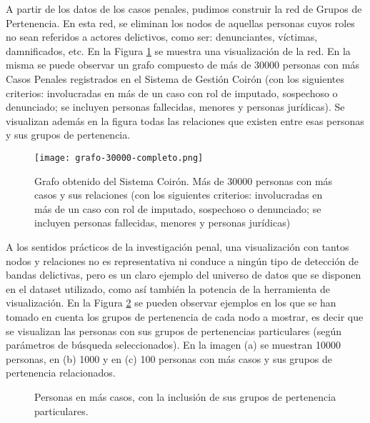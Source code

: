 A partir de los datos de los casos penales, pudimos construir la red de Grupos de Pertenencia. En esta red, se eliminan los nodos de aquellas personas cuyos roles no sean referidos a actores delictivos, como ser: denunciantes, víctimas, damnificados, etc. En la Figura \ref{fig:grafocompleto} se muestra una visualización de la red. En la misma se puede observar un grafo compuesto de más de 30000 personas con más Casos Penales registrados en el Sistema de Gestión Coirón (con los siguientes criterios: involucradas en más de un caso con rol de imputado, sospechoso o denunciado; se incluyen personas fallecidas, menores y personas jurídicas). Se visualizan además en la figura todas las relaciones que existen entre esas personas y sus grupos de pertenencia.
\begin{figure}
	\centering
	\texttt{[image: grafo-30000-completo.png]}
	\caption{Grafo obtenido del Sistema Coirón. Más de 30000 personas con más casos y sus relaciones (con los siguientes criterios: involucradas en más de un caso con rol de imputado, sospechoso o denunciado; se incluyen personas fallecidas, menores y personas jurídicas)} 
	\label{fig:grafocompleto}
\end{figure}
A los sentidos prácticos de la investigación penal, una visualización con tantos nodos y relaciones no es representativa ni conduce a ningún tipo de detección de bandas delictivas, pero es un claro ejemplo del universo de datos que se disponen en el dataset utilizado, como así también la potencia de la herramienta de visualización. En la Figura \ref{fig:grafosCompletos} se pueden observar ejemplos en los que se han tomado en cuenta los grupos de pertenencia de cada nodo a mostrar, es decir que se visualizan las personas con sus grupos de pertenencias particulares (según parámetros de búsqueda seleccionados). En la imagen (a) se muestran 10000 personas, en (b) 1000 y en (c) 100 personas con más casos y sus grupos de pertenencia relacionados.
\begin{figure}[htbp]
	\centering
	\centering
	\caption{ Personas en más casos, con la inclusión de sus grupos de pertenencia particulares.}
	\label{fig:grafosCompletos}
\end{figure}
